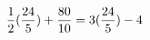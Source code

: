 \documentclass[preview]{standalone}
\begin{document}
\begin{align*}
\special{dvisvgm:raw <g id='unique000'>}\frac{1}{2} (\frac{24}{5}) + \frac{80}{10} = 3(\frac{24}{5}) - 4\special{dvisvgm:raw </g>}
\end{align*}
\end{document}
